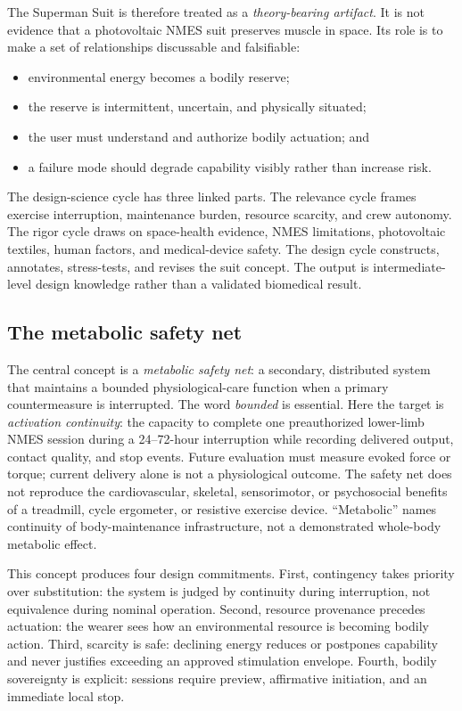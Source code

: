 \documentclass[runningheads]{llncs}
\begin{document}
The Superman Suit is therefore treated as a \emph{theory-bearing artifact}. It is not evidence that a photovoltaic NMES suit preserves muscle in space. Its role is to make a set of relationships discussable and falsifiable:

\begin{itemize}
\item environmental energy becomes a bodily reserve;
\item the reserve is intermittent, uncertain, and physically situated;
\item the user must understand and authorize bodily actuation; and
\item a failure mode should degrade capability visibly rather than increase risk.
\end{itemize}

The design-science cycle has three linked parts. The relevance cycle frames exercise interruption, maintenance burden, resource scarcity, and crew autonomy. The rigor cycle draws on space-health evidence, NMES limitations, photovoltaic textiles, human factors, and medical-device safety. The design cycle constructs, annotates, stress-tests, and revises the suit concept. The output is intermediate-level design knowledge rather than a validated biomedical result.

\subsection{The metabolic safety net}

The central concept is a \emph{metabolic safety net}: a secondary, distributed system that maintains a bounded physiological-care function when a primary countermeasure is interrupted. The word \emph{bounded} is essential. Here the target is \emph{activation continuity}: the capacity to complete one preauthorized lower-limb NMES session during a 24--72-hour interruption while recording delivered output, contact quality, and stop events. Future evaluation must measure evoked force or torque; current delivery alone is not a physiological outcome. The safety net does not reproduce the cardiovascular, skeletal, sensorimotor, or psychosocial benefits of a treadmill, cycle ergometer, or resistive exercise device. ``Metabolic'' names continuity of body-maintenance infrastructure, not a demonstrated whole-body metabolic effect.

This concept produces four design commitments. First, contingency takes priority over substitution: the system is judged by continuity during interruption, not equivalence during nominal operation. Second, resource provenance precedes actuation: the wearer sees how an environmental resource is becoming bodily action. Third, scarcity is safe: declining energy reduces or postpones capability and never justifies exceeding an approved stimulation envelope. Fourth, bodily sovereignty is explicit: sessions require preview, affirmative initiation, and an immediate local stop.
\end{document}
